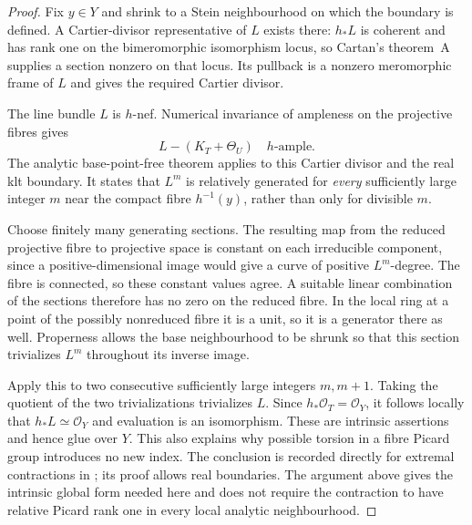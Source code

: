 \begin{proof}
Fix $y\in Y$ and shrink to a Stein neighbourhood on which the boundary
is defined. A Cartier-divisor representative of $L$ exists there:
$h_*L$ is coherent and has rank one on the bimeromorphic isomorphism
locus, so Cartan's theorem~A supplies a section nonzero on that locus.
Its pullback is a nonzero meromorphic frame of $L$ and gives the
required Cartier divisor.

The line bundle $L$ is $h$-nef. Numerical invariance of ampleness on
the projective fibres gives
\[
                 L-(K_T+\Theta_U)\quad\text{$h$-ample}.
\]
The analytic base-point-free theorem
\cite[Theorem~6.2]{Fujino2022} applies to this Cartier divisor and the
real klt boundary. It states that $L^m$ is relatively generated for
\emph{every} sufficiently large integer $m$ near the compact fibre
$h^{-1}(y)$, rather than only for divisible $m$.

Choose finitely many generating sections. The resulting map from
the reduced projective fibre to projective space is constant on each
irreducible component, since a positive-dimensional image would give
a curve of positive $L^m$-degree. The fibre is connected, so these
constant values agree. A suitable linear combination of the sections
therefore has no zero on the reduced fibre. In the local ring at a
point of the possibly nonreduced fibre it is a unit, so it is a
generator there as well. Properness allows the base neighbourhood to
be shrunk so that this section trivializes $L^m$ throughout its
inverse image.

Apply this to two consecutive sufficiently large integers $m,m+1$.
Taking the quotient of the two trivializations trivializes $L$.
Since $h_*\mathcal O_T=\mathcal O_Y$, it follows locally that
$h_*L\simeq\mathcal O_Y$ and evaluation is an isomorphism. These are
intrinsic assertions and hence glue over $Y$. This also explains why
possible torsion in a fibre Picard group introduces no new index.
The conclusion is recorded directly for extremal contractions in
\cite[Theorem~7.2(2)(iii)]{Fujino2022}; its proof allows real
boundaries. The argument above gives the intrinsic global form needed
here and does not require the contraction to have relative Picard
rank one in every local analytic neighbourhood.
\end{proof}

